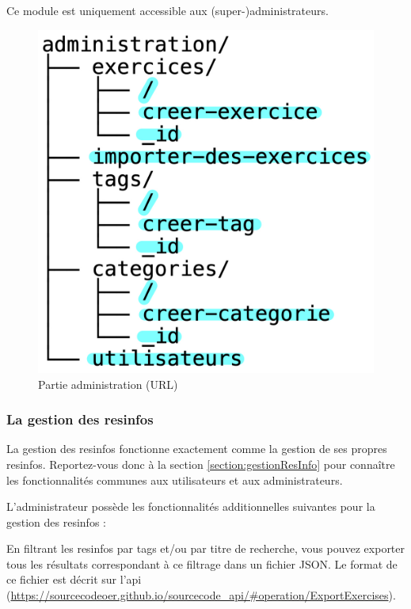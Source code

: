 Ce module est uniquement accessible aux (super-)administrateurs.

\begin{figure}[H]
    \includegraphics[width=\textwidth,height=0.25\textheight,keepaspectratio]{images/client/administration.jpeg}
    \centering
    \caption[SourceCode : partie administration (URL)]{Partie administration (URL)}
\end{figure}

\subsubsection{La gestion des \glspl{resinfo}}
\label{section:resInfoAdmin}

La gestion des \glspl{resinfo} fonctionne exactement comme la gestion de ses propres \glspl{resinfo}. Reportez-vous donc à la section \ref{section:gestionResInfo} pour connaître les fonctionnalités communes aux utilisateurs et aux administrateurs.

L'administrateur possède les fonctionnalités additionnelles suivantes pour la gestion des \glspl{resinfo} :

 
En filtrant les \glspl{resinfo} par \glspl{tag} et/ou par titre de recherche, vous pouvez exporter tous les résultats correspondant à ce filtrage dans un fichier JSON. Le format de ce fichier est décrit sur l'api (\url{https://sourcecodeoer.github.io/sourcecode_api/#operation/ExportExercises}).

